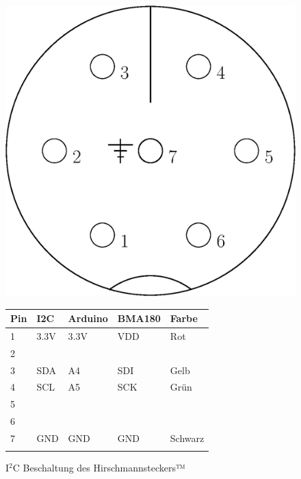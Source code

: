 \documentclass[12pt,a4paper]{scrartcl}
\begin{document}
\begin{figure}[H]
	\begin{minipage}[H]{8cm}
		\centering
		\includegraphics[scale=.5]{hardwareimages/hirschmann_i2c.eps}
	\end{minipage}
	\hfill
	\begin{minipage}[H]{8cm}
		\centering
		\begin{tabular}{@{}lllll@{}}    
      			\cmidrule(r){1-5}\morecmidrules\cmidrule(r){1-5}
       			Pin & I2C & Arduino & BMA180 & Farbe\\
      			\midrule
 			1 & 3.3V & 3.3V & VDD & Rot \\ 
 			2 & & & &\\
 			3 & SDA & A4 & SDI & Gelb\\
 			4 & SCL & A5 & SCK & Grün\\
 			5 & & & &\\
 			6 & & & &\\
 			7 & GND & GND & GND & Schwarz\\
   			\addlinespace
   			\bottomrule
 		\end{tabular}
	\end{minipage}
	\caption{I$^2$C Beschaltung des Hirschmannsteckers™}
	\label{hirschmann_i2c}
\end{figure}
\end{document}
